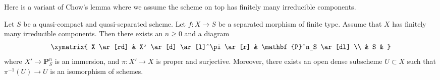 \noindent
Here is a variant of Chow's lemma where we assume the scheme
on top has finitely many irreducible components.

\begin{lemma}
\label{lemma-chow-EGA}
Let $S$ be a quasi-compact and quasi-separated scheme.
Let $f : X \to S$ be a separated morphism of finite type.
Assume that $X$ has finitely many irreducible components.
Then there exists an $n \geq 0$ and a diagram
$$
\xymatrix{
X \ar[rd] & X' \ar[d] \ar[l]^\pi \ar[r] & \mathbf{P}^n_S \ar[dl] \\
& S &
}
$$
where $X' \to \mathbf{P}^n_S$ is an immersion, and
$\pi : X' \to X$ is proper and surjective. Moreover, there exists
an open dense subscheme $U \subset X$ such that $\pi^{-1}(U) \to U$
is an isomorphism of schemes.
\end{lemma}

